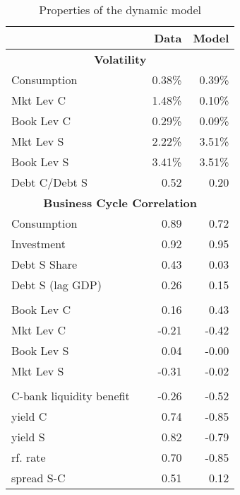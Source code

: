 \documentclass[letterpaper,12pt,dvipsnames,usenames]{article}
\theoremstyle{plain}
\begin{document}
\clearpage 
\newpage
 \begin{table}[h]
  \centering
   \caption{Properties of the dynamic model}
        \begin{tabular}{lrrr}
  \toprule
                               & & Data  & Model \\  
                                    \midrule
          \multicolumn{4}{c}{\textbf{Volatility}} \\
          Consumption  & &  0.38\% &0.39\%     \\
        Mkt    Lev C          &  &1.48\% &0.10\%  \\
     Book     Lev C          &  &0.29\% &0.09\%  \\
         Mkt    Lev S           &  &2.22\% & 3.51\%   \\
        Book    Lev S           &  &3.41\% & 3.51\%   \\
     Debt C/Debt S      &  & 0.52 & 0.20   \\
  \midrule
           \multicolumn{4}{c}{\textbf{Business Cycle Correlation}} \\ 
   Consumption      & & 0.89 & 0.72    \\
       Investment      & & 0.92 & 0.95    \\
   Debt S Share        &  &0.43 & 0.03  \\
   Debt S (lag GDP)  &  &0.26 & 0.15  \\ \\
   Book Lev C     &  & 0.16 &0.43  \\
   Mkt    Lev C     &  & -0.21 &-0.42  \\
   Book Lev S      &  &  0.04 & -0.00   \\
   Mkt    Lev S     &  & -0.31 & -0.02   \\
 \\
   C-bank liquidity  benefit &  & -0.26 & -0.52  \\
   yield C             &  & 0.74 &-0.85  \\
   yield S             &  & 0.82 & -0.79   \\
   rf. rate             &  & 0.70 &-0.85  \\
   spread S-C     & & 0.51 &  0.12   \\
        \bottomrule
     \end{tabular}
    \label{tab:bcprop}
 \end{table} 
\end{document}
